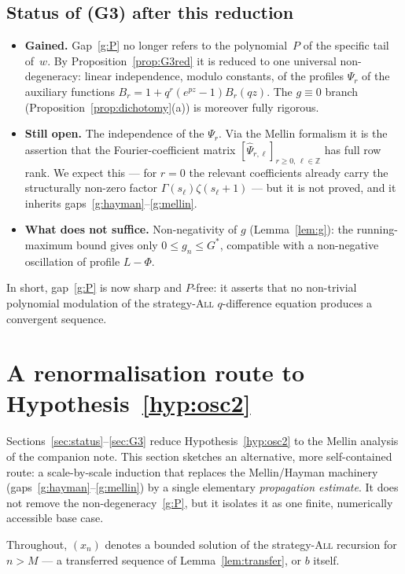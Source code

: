 \documentclass[11pt]{article}
\theoremstyle{definition}
\newcommand{\All}{\textsc{All}}
\newcommand{\Z}{\mathbb{Z}}
\begin{document}
\subsection{Status of (G3) after this reduction}

\begin{itemize}[leftmargin=1.6em]
\item \textbf{Gained.} Gap~\ref{g:P} no longer refers to the
  polynomial~$P$ of the specific tail of~$w$. By
  Proposition~\ref{prop:G3red} it is reduced to one universal
  non-degeneracy: linear independence, modulo constants, of the
  profiles $\Psi_r$ of the auxiliary functions
  $B_r=1+q^r(e^{pz}-1)B_r(qz)$. The $g\equiv0$ branch
  (Proposition~\ref{prop:dichotomy}(a)) is moreover fully rigorous.
\item \textbf{Still open.} The independence of the $\Psi_r$. Via the
  Mellin formalism it is the assertion that the Fourier-coefficient
  matrix $[\widehat\Psi_{r,\ell}]_{r\ge0,\,\ell\in\Z}$ has full row
  rank. We expect this --- for $r=0$ the relevant coefficients already
  carry the structurally non-zero factor $\Gamma(s_\ell)\zeta(s_\ell+1)$
  --- but it is not proved, and it inherits
  gaps~\ref{g:hayman}--\ref{g:mellin}.
\item \textbf{What does not suffice.} Non-negativity of $g$
  (Lemma~\ref{lem:g}): the running-maximum bound gives only $0\le
  g_n\le G^\ast$, compatible with a non-negative oscillation of
  profile $L-\Phi$.
\end{itemize}
In short, gap~\ref{g:P} is now sharp and $P$-free: it asserts that no
non-trivial polynomial modulation of the strategy-\All{}
$q$-difference equation produces a convergent sequence.

\section{A renormalisation route to Hypothesis~\ref{hyp:osc2}}
\label{sec:renorm}

Sections~\ref{sec:status}--\ref{sec:G3} reduce
Hypothesis~\ref{hyp:osc2} to the Mellin analysis of the companion
note. This section sketches an alternative, more self-contained route:
a scale-by-scale induction that replaces the Mellin/Hayman machinery
(gaps~\ref{g:hayman}--\ref{g:mellin}) by a single elementary
\emph{propagation estimate}. It does not remove the
non-degeneracy~\ref{g:P}, but it isolates it as one finite,
numerically accessible base case.

Throughout, $(x_n)$ denotes a bounded solution of the strategy-\All{}
recursion for $n>M$ --- a transferred sequence of
Lemma~\ref{lem:transfer}, or $b$ itself.
\end{document}
